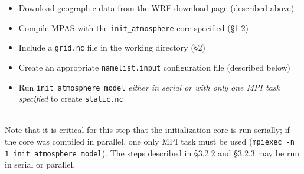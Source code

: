\begin{itemize}
\item Download geographic data from the WRF download page (described above) 
\item Compile MPAS with the {\tt init\_atmosphere} core specified (\S 1.2)
\item Include a {\tt grid.nc} file in the working directory (\S 2)
\item Create an appropriate {\tt namelist.input} configuration file (described below)
\item Run {\tt init\_atmosphere\_model} {\em either in serial or with only one MPI task specified} to create {\tt static.nc}
\end{itemize}~\\
Note that it is critical for this step that the initialization core is run serially; if the core was compiled in parallel, one only MPI task must be used ({\tt mpiexec -n 1 init\_atmosphere\_model}).  The steps described in \S 3.2.2 and \S 3.2.3 may be run in serial or parallel.

